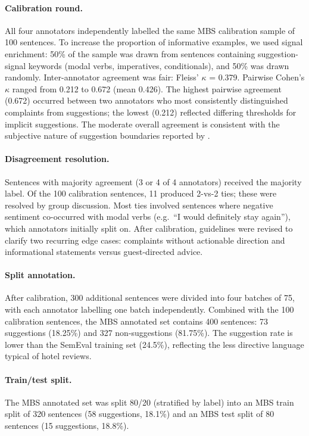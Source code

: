\paragraph{Calibration round.} All four annotators independently
  labelled the same MBS calibration sample of 100 sentences. To
  increase the proportion of informative examples, we used signal
  enrichment: 50\% of the sample was drawn from sentences
  containing suggestion-signal keywords (modal verbs, imperatives,
  conditionals), and 50\% was drawn randomly. Inter-annotator
  agreement was fair: Fleiss' $\kappa$ = 0.379. Pairwise Cohen's
  $\kappa$ ranged from 0.212 to 0.672 (mean 0.426). The highest
  pairwise agreement (0.672) occurred between two annotators who
  most consistently distinguished complaints from suggestions; the
  lowest (0.212) reflected differing thresholds for implicit
  suggestions. The moderate overall agreement is consistent with
  the subjective nature of suggestion boundaries reported by
  \citet{negi2018open}.

\paragraph{Disagreement resolution.} Sentences with majority
  agreement (3 or 4 of 4 annotators) received the majority label.
  Of the 100 calibration sentences, 11 produced 2-vs-2 ties; these
  were resolved by group discussion. Most ties involved sentences
  where negative sentiment co-occurred with modal verbs (e.g.\
  ``I would definitely stay again''), which annotators initially
  split on. After calibration, guidelines were revised to clarify
  two recurring edge cases: complaints without actionable direction
  and informational statements versus guest-directed advice.

\paragraph{Split annotation.} After calibration, 300 additional
  sentences were divided into four batches of 75, with each
  annotator labelling one batch independently. Combined with the
  100 calibration sentences, the MBS annotated set contains 400
  sentences: 73 suggestions (18.25\%) and 327 non-suggestions
  (81.75\%). The suggestion rate is lower than the SemEval training
  set (24.5\%), reflecting the less directive language typical of
  hotel reviews.

\paragraph{Train/test split.} The MBS annotated set was split
  80/20 (stratified by label) into an MBS train split of 320
  sentences (58 suggestions, 18.1\%) and an MBS test split of 80
  sentences (15 suggestions, 18.8\%).
